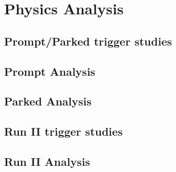 \chapter{Physics Analysis}

\section{Prompt/Parked trigger studies}

\section{Prompt Analysis}

\section{Parked Analysis}

\section{Run II trigger studies}

\section{Run II Analysis}

